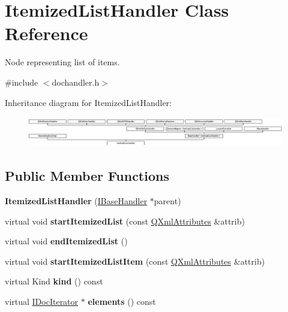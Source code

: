 \hypertarget{class_itemized_list_handler}{}\section{Itemized\+List\+Handler Class Reference}
\label{class_itemized_list_handler}


Node representing list of items.  




{\ttfamily \#include $<$dochandler.\+h$>$}

Inheritance diagram for Itemized\+List\+Handler\+:\begin{figure}[H]
\begin{center}
\leavevmode
\includegraphics[height=1.327801cm]{class_itemized_list_handler}
\end{center}
\end{figure}
\subsection*{Public Member Functions}
\begin{DoxyCompactItemize}
\item 
\mbox{\label{class_itemized_list_handler_a1064ca6abf6830a8be4020e725b0f7aa}} 
{\bfseries Itemized\+List\+Handler} (\mbox{\hyperlink{class_i_base_handler}{I\+Base\+Handler}} $\ast$parent)
\item 
\mbox{\label{class_itemized_list_handler_a8f429f17b500def4158786c09911cff6}} 
virtual void {\bfseries start\+Itemized\+List} (const \mbox{\hyperlink{class_q_xml_attributes}{Q\+Xml\+Attributes}} \&attrib)
\item 
\mbox{\label{class_itemized_list_handler_a5a8688eeeba8c6eff5be740755065e20}} 
virtual void {\bfseries end\+Itemized\+List} ()
\item 
\mbox{\label{class_itemized_list_handler_abc8eecc760fc90748d2c5e4a9c9964fc}} 
virtual void {\bfseries start\+Itemized\+List\+Item} (const \mbox{\hyperlink{class_q_xml_attributes}{Q\+Xml\+Attributes}} \&attrib)
\item 
\mbox{\label{class_itemized_list_handler_a1f227702cbda8ec7db5a4230d9e2294f}} 
virtual Kind {\bfseries kind} () const
\item 
\mbox{\label{class_itemized_list_handler_a0a1a44d1651a2d90f2fbaa5a307887fa}} 
virtual \mbox{\hyperlink{class_i_doc_iterator}{I\+Doc\+Iterator}} $\ast$ {\bfseries elements} () const
\end{DoxyCompactItemize}
